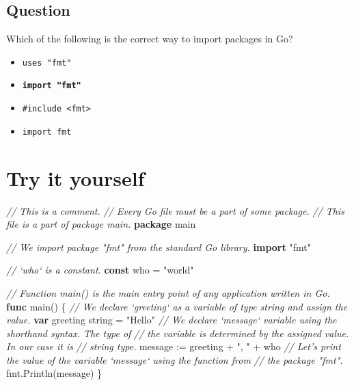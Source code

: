 \documentclass[]{book}
\newenvironment{Shaded}{\begin{snugshade}}{\end{snugshade}}
\newcommand{\CommentTok}[1]{\textcolor[rgb]{0.56,0.35,0.01}{\textit{#1}}}
\newcommand{\DataTypeTok}[1]{\textcolor[rgb]{0.13,0.29,0.53}{#1}}
\newcommand{\KeywordTok}[1]{\textcolor[rgb]{0.13,0.29,0.53}{\textbf{#1}}}
\newcommand{\NormalTok}[1]{#1}
\newcommand{\StringTok}[1]{\textcolor[rgb]{0.31,0.60,0.02}{#1}}
\providecommand{\tightlist}{%
  \setlength{\itemsep}{0pt}\setlength{\parskip}{0pt}}
\begin{document}
\hypertarget{question-18}{%
\subsection*{Question}\label{question-18}}

Which of the following is the correct way to import packages in Go?

\begin{itemize}
\tightlist
\item
  \texttt{uses\ "fmt"}
\item
  \textbf{\texttt{import\ "fmt"}}
\item
  \texttt{\#include\ \textless{}fmt\textgreater{}}
\item
  \texttt{import\ fmt}
\end{itemize}

\hypertarget{try-it-yourself}{%
\section*{Try it yourself}\label{try-it-yourself}}

\begin{Shaded}
\begin{Highlighting}[]
\CommentTok{// This is a comment.}
\CommentTok{// Every Go file must be a part of some package.}
\CommentTok{// This file is a part of package main.}
\KeywordTok{package}\NormalTok{ main}

\CommentTok{// We import package "fmt" from the standard Go library.}
\KeywordTok{import} \StringTok{"fmt"}

\CommentTok{// `who` is a constant.}
\KeywordTok{const}\NormalTok{ who = }\StringTok{"world"}

\CommentTok{// Function main() is the main entry point of any application written in Go.}
\KeywordTok{func}\NormalTok{ main() \{}
    \CommentTok{// We declare `greeting` as a variable of type string and assign the value.}
    \KeywordTok{var}\NormalTok{ greeting }\DataTypeTok{string}\NormalTok{ = }\StringTok{"Hello"}
    \CommentTok{// We declare `message` variable using the shorthand syntax. The type of}
    \CommentTok{// the variable is determined by the assigned value. In our case it is}
    \CommentTok{// string type.}
\NormalTok{    message := greeting + }\StringTok{", "}\NormalTok{ + who}
    \CommentTok{// Let's print the value of the variable `message` using the function from}
    \CommentTok{// the package "fmt".}
\NormalTok{    fmt.Println(message)}
\NormalTok{\}}
\end{Highlighting}
\end{Shaded}
\end{document}
